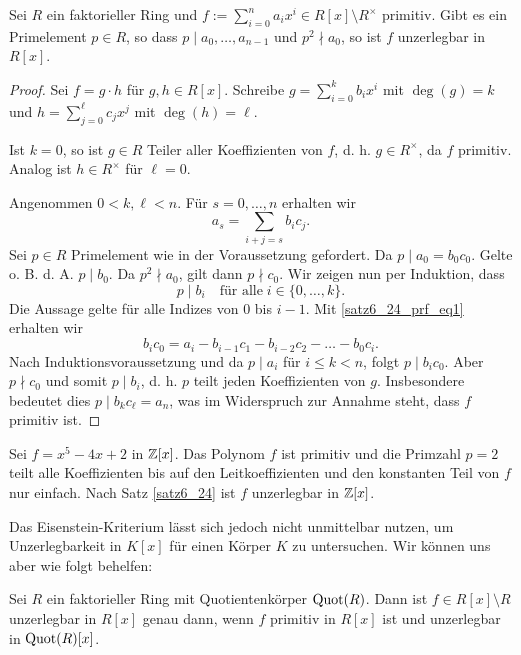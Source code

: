 \begin{satz}\label{satz6_24}
	Sei $R$ ein faktorieller Ring und $f := \sum_{i=0}^n a_i x^i \in R[x] \setminus R^\times$ primitiv. Gibt es ein Primelement $p \in R$, so dass $p \mid a_0, \dots, a_{n-1}$ und $p^2 \nmid a_0$, so ist $f$ unzerlegbar in $R[x]$.
\end{satz}
\begin{proof}
	Sei $f = g\cdot h$ für $g, h \in R[x]$. Schreibe $g = \sum_{i=0}^k b_i x^i$ mit $\deg(g) = k$ und $h = \sum_{j = 0}^\ell c_j x^j$ mit $\deg(h) = \ell$.
	
	Ist $k = 0$, so ist $g \in R$ Teiler aller Koeffizienten von $f$, d. h. $g \in R^\times$, da $f$ primitiv. Analog ist $h \in R^\times$ für $\ell = 0$.
	
	Angenommen $0 < k,\ell < n$. Für $s = 0, \dots, n$ erhalten wir
	\begin{equation}\label{satz6_24_prf_eq1}
		a_s = \sum_{i+j = s} b_i c_j.
	\end{equation}
	Sei $p \in R$ Primelement wie in der Voraussetzung gefordert. Da $p \mid a_0 = b_0 c_0$. Gelte o. B. d. A. $p \mid b_0$. Da $p^2 \nmid a_0$, gilt dann $p \nmid c_0$. Wir zeigen nun per Induktion, dass 
	\[p \mid b_i \quad \text{für alle} \; i \in \{0,\dots, k\}.\]
	Die Aussage gelte für alle Indizes von $0$ bis $i-1$. Mit \eqref{satz6_24_prf_eq1} erhalten wir
	\[b_i c_0 = a_i - b_{i-1} c_1 - b_{i-2} c_2 - \dots - b_0 c_i.\]
	Nach Induktionsvoraussetzung und da $p \mid a_i$ für $i \leq k < n$, folgt $p \mid b_i c_0$. Aber $p \nmid c_0$ und somit $p \mid b_i$, d. h. $p$ teilt jeden Koeffizienten von $g$. Insbesondere bedeutet dies $p \mid b_k c_\ell = a_n$, was im Widerspruch zur Annahme steht, dass $f$ primitiv ist.
\end{proof}
\begin{beispiel}\label{beispiel6_25}
	Sei $f = x^5 - 4x + 2$ in $\mathbb{Z}[x]$. Das Polynom $f$ ist primitiv und die Primzahl $p = 2$ teilt alle Koeffizienten bis auf den Leitkoeffizienten und den konstanten Teil von $f$ nur einfach. Nach Satz \ref{satz6_24} ist $f$ unzerlegbar in $\mathbb{Z}[x]$.
\end{beispiel}
Das Eisenstein-Kriterium lässt sich jedoch nicht unmittelbar nutzen, um Unzerlegbarkeit in $K[x]$ für einen Körper $K$ zu untersuchen. Wir können uns aber wie folgt behelfen:
\begin{satz}\label{satz6_26}
	Sei $R$ ein faktorieller Ring mit Quotientenkörper $\mathrm{Quot}(R)$. Dann ist $f \in R[x] \setminus R$ unzerlegbar in $R[x]$ genau dann, wenn $f$ primitiv in $R[x]$ ist und unzerlegbar in $\mathrm{Quot}(R)[x]$.
\end{satz}
